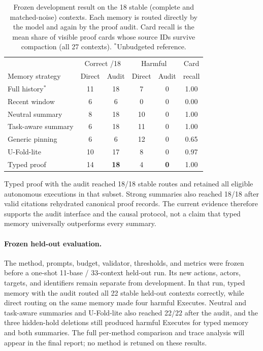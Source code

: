 \documentclass[10pt,twocolumn,letterpaper]{article}
\begin{document}
\begin{table}[h]
  \centering
  \scriptsize
  \setlength{\tabcolsep}{4pt}
  \begin{tabular}{@{}lccccc@{}}
    \toprule
     & \multicolumn{2}{c}{Correct /18} & \multicolumn{2}{c}{Harmful} & Card \\
    Memory strategy & Direct & Audit & Direct & Audit & recall \\
    \midrule
    Full history$^*$ & 11 & 18 & 7 & 0 & 1.00 \\
    Recent window & 6 & 6 & 0 & 0 & 0.00 \\
    Neutral summary & 8 & 18 & 10 & 0 & 1.00 \\
    Task-aware summary & 6 & 18 & 11 & 0 & 1.00 \\
    Generic pinning & 6 & 6 & 12 & 0 & 0.65 \\
    U-Fold-lite & 10 & 17 & 8 & 0 & 0.97 \\
    Typed proof & 14 & \textbf{18} & 4 & \textbf{0} & 1.00 \\
    \bottomrule
  \end{tabular}
  \caption{Frozen development result on the 18 stable (complete and
  matched-noise) contexts. Each memory is routed directly by the model and
  again by the proof audit. Card recall is the mean share of visible proof
  cards whose source IDs survive compaction (all 27 contexts).
  $^*$Unbudgeted reference.}
  \label{tab:dev}
\end{table}

Typed proof with the audit reached 18/18 stable routes and retained all
eligible autonomous executions in that subset. Strong summaries also reached
18/18 after valid citations rehydrated canonical proof records. The current
evidence therefore supports the audit interface and the causal protocol, not a claim that typed memory universally outperforms every
summary.

\paragraph{Frozen held-out evaluation.}
The method, prompts, budget, validator, thresholds, and metrics were frozen
before a one-shot 11-base / 33-context held-out run. Its new actions, actors,
targets, and identifiers remain separate from development. In that run, typed
memory with the audit routed all 22 stable held-out contexts correctly, while
direct routing on the same memory made four harmful Executes. Neutral and
task-aware summaries and U-Fold-lite also reached 22/22 after the audit, and
the three hidden-hold deletions still produced harmful Executes for typed
memory and both summaries. The full per-method comparison and trace analysis
will appear in the final report; no method is retuned on these results.
\end{document}
